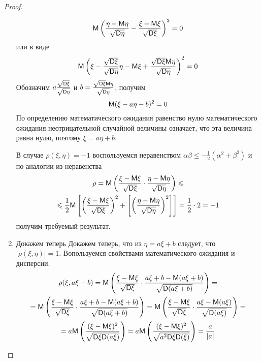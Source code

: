 \begin{proof}
\begin{enumerate}
		\begin{equation*}
			\mathsf{M}\left(
			\frac{\eta-\mathsf{M}\eta}{\sqrt{\mathsf{D}\eta}}-\frac{\xi-\mathsf{M} \xi}{\sqrt{\mathsf{D}\xi}} 
			\right)^2=0
		\end{equation*}
		или в виде
		\begin{equation*}
			\mathsf{M}\left(\xi-\frac{\sqrt{\mathsf{D} \xi}}{\sqrt{\mathsf{D} \eta}}\eta-\mathsf{M} \xi+
			\frac{\sqrt{\mathsf{D} \xi}\mathsf{M}\eta}{\sqrt{\mathsf{D} \eta}}
			\right)^2=0
		\end{equation*}
		Обозначим $a\frac{\sqrt{\mathsf{D}\xi}}{\sqrt{\mathsf{D}\eta}}$ и $b=\frac{\sqrt{\mathsf{D} \xi}\mathsf{M}\eta}{\sqrt{\mathsf{D} \eta}}$, получим
		\begin{equation*}
			\mathsf{M}(\xi-a \eta-b)^2=0
		\end{equation*}
		По определению математического ожидания равенство нулю математического ожидания неотрицательной случайной величины означает, что эта величина равна нулю, поэтому $\xi = a\eta + b$.

		В случае $\rho(\xi, \eta) = −1$ воспользуемся неравенством $\alpha\beta \leqslant −\frac{1}{2}(\alpha^2 + \beta^2)$ и по аналогии из неравенства
		\begin{gather*}
			\rho=\mathsf{M}\left(
			\frac{\xi-\mathsf{M} \xi}{\sqrt{\mathsf{D} \xi}}
			\cdot
			\frac{\eta-\mathsf{M}\eta}{\sqrt{\mathsf{D}\eta}} 
			\right)
			\leqslant\\\leqslant
			\frac{1}{2}\mathsf{M}
			\left[ 
			\left(\frac{\xi-\mathsf{M} \xi}{\sqrt{\mathsf{D} \xi}}\right)^2
			+
			\left[ \left(\frac{\eta-\mathsf{M}\eta}{\sqrt{\mathsf{D}\eta}}\right)^2
			\right]\right]
			=\frac{1}{2}\cdot2=-1
		\end{gather*}
		получим требуемый результат.

		\item Докажем теперь Докажем теперь, что из $\eta = a\xi + b$ следует, что $|\rho	(\xi, \eta)| = 1$. Вопользуемся свойствами математического ожидания и дисперсии.
		\begin{gather*}
			\rho(\xi,a\xi+b)=
			\mathsf{M}
			\left(
			\frac{\xi-\mathsf{M}\xi}{\sqrt{\mathsf{D}\xi}}
			\cdot
			\frac{a\xi+b-\mathsf{M} (a\xi+b)}{\sqrt{\mathsf{D}( a\xi+b)}}
			\right)
			=\\=
			\mathsf{M}\left(
			\frac{\xi-\mathsf{M} \xi}{\sqrt{\mathsf{D}\xi}}\cdot
			\frac{a\xi+b-\mathsf{M} (a\xi+b)}{\sqrt{\mathsf{D} (a\xi+b)}} 
			\right)=
			\mathsf{M}\left(
			\frac{\xi-\mathsf{M} \xi}{\sqrt{\mathsf{D}\xi}}\cdot
			\frac{a\xi-\mathsf{M} (a\xi)}{\sqrt{\mathsf{D} (a\xi)}} 
			\right)=\\=
			a\mathsf{M}\left(
			\frac{(\xi-\mathsf{M}\xi)^2}{\sqrt{\mathsf{D}\xi\mathsf{D}(a\xi)}}
			\right)=
			a\mathsf{M}\left(
			\frac{(\xi-\mathsf{M}\xi)^2}{\sqrt{a^2\mathsf{D}\xi\mathsf{D}(\xi)}}
			\right)=\frac{a}{|a|}
		\end{gather*}
	\end{enumerate}
\end{proof}

